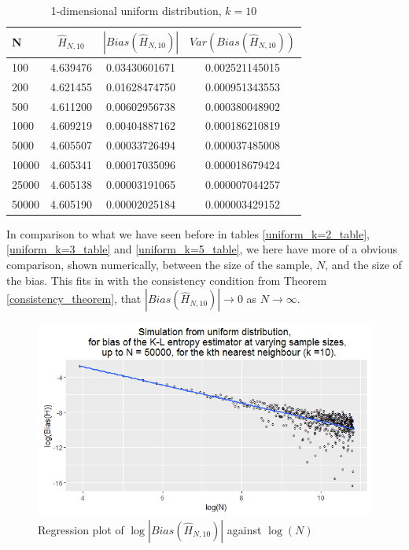 \documentclass{article}
\begin{document}
\begin{table}
\caption{1-dimensional uniform distribution, $k=10$} \label{uniform_k=10_table}
\begin{center}
\begin{tabular}{| l | c c c|} 
\toprule
N & $\hat{H}_{N, 10}$ & $|Bias(\hat{H}_{N, 10})|$ & $Var(Bias(\hat{H}_{N, 10}))$ \\
\midrule[1pt]
100     & 4.639476     & 0.03430601671     & 0.002521145015  \\
200     & 4.621455     & 0.01628474750     & 0.000951343553  \\
500     & 4.611200     & 0.00602956738     & 0.000380048902  \\
1000    & 4.609219     & 0.00404887162     & 0.000186210819  \\
5000    & 4.605507     & 0.00033726494     & 0.000037485008  \\
10000   & 4.605341     & 0.00017035096     & 0.000018679424  \\
25000   & 4.605138     & 0.00003191065     & 0.000007044257  \\
50000   & 4.605190     & 0.00002025184     & 0.000003429152  \\
\hline
\end{tabular}
\end{center}
\end{table}

In comparison to what we have seen before in tables \ref{uniform_k=2_table}, \ref{uniform_k=3_table} and \ref{uniform_k=5_table}, we here have more of a obvious comparison, shown numerically, between the size of the sample, $N$, and the size of the bias. This fits in with the consistency condition from Theorem \ref{consistency_theorem}, that $|Bias(\hat{H}_{N, 10})| \to 0$ as $N \to \infty$. 

\begin{figure}
  \begin{center}
    \includegraphics[width=\textwidth]{./Graphs/Uniform_k=10_plot.png}
  \end{center}
\caption{Regression plot of $\log|Bias(\hat{H}_{N, 10})|$ against $\log(N)$}
  \label{uniform_k=10_graph}
\end{figure}
\end{document}

